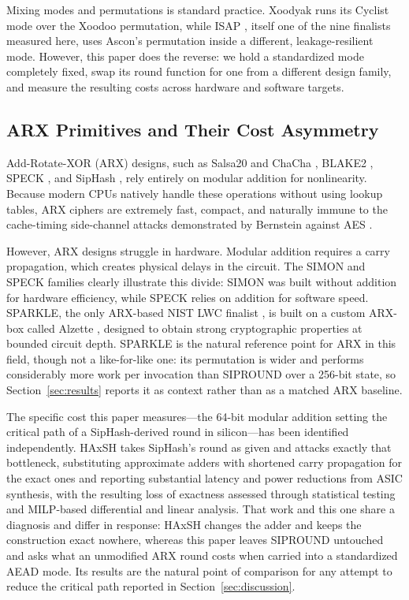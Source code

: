 Mixing modes and permutations is standard practice. Xoodyak \cite{xoodyak} runs its Cyclist mode over the Xoodoo permutation, while ISAP \cite{isap}, itself one of the nine finalists measured here, uses Ascon's permutation inside a different, leakage-resilient mode. However, this paper does the reverse: we hold a standardized mode completely fixed, swap its round function for one from a different design family, and measure the resulting costs across hardware and software targets.

\subsection{ARX Primitives and Their Cost Asymmetry}
Add-Rotate-XOR (ARX) designs, such as Salsa20 and ChaCha \cite{salsa,chacha}, BLAKE2 \cite{blake2}, SPECK \cite{simonspeck}, and SipHash \cite{siphash}, rely entirely on modular addition for nonlinearity. Because modern CPUs natively handle these operations without using lookup tables, ARX ciphers are extremely fast, compact, and naturally immune to the cache-timing side-channel attacks demonstrated by Bernstein against AES \cite{aes-cache}.

However, ARX designs struggle in hardware. Modular addition requires a carry propagation, which creates physical delays in the circuit. The SIMON and SPECK families \cite{simonspeck} clearly illustrate this divide: SIMON was built without addition for hardware efficiency, while SPECK relies on addition for software speed. SPARKLE, the only ARX-based NIST LWC finalist \cite{sparkle}, is built on a custom ARX-box called Alzette \cite{alzette}, designed to obtain strong cryptographic properties at bounded circuit depth. SPARKLE is the natural reference point for ARX in this field, though not a like-for-like one: its permutation is wider and performs considerably more work per invocation than SIPROUND over a 256-bit state, so Section~\ref{sec:results} reports it as context rather than as a matched ARX baseline.

The specific cost this paper measures---the 64-bit modular addition setting the critical path of a SipHash-derived round in silicon---has been identified independently. HAxSH \cite{haxsh} takes SipHash's round as given and attacks exactly that bottleneck, substituting approximate adders with shortened carry propagation for the exact ones and reporting substantial latency and power reductions from ASIC synthesis, with the resulting loss of exactness assessed through statistical testing and MILP-based differential and linear analysis. That work and this one share a diagnosis and differ in response: HAxSH changes the adder and keeps the construction exact nowhere, whereas this paper leaves SIPROUND untouched and asks what an unmodified ARX round costs when carried into a standardized AEAD mode. Its results are the natural point of comparison for any attempt to reduce the critical path reported in Section~\ref{sec:discussion}.

